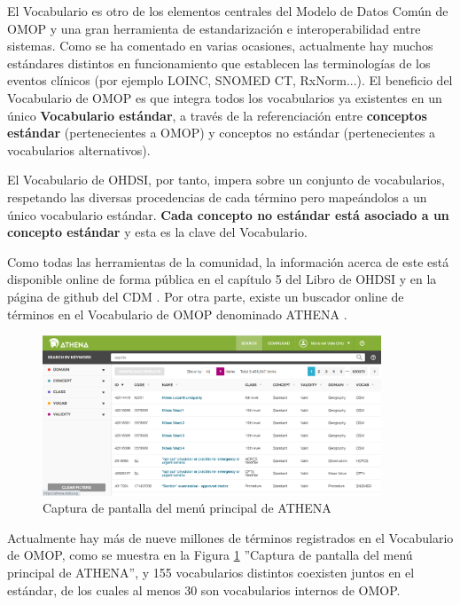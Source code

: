 El Vocabulario es otro de los elementos centrales del Modelo de Datos Común de OMOP y una gran herramienta de estandarización e interoperabilidad entre sistemas. Como se ha comentado en varias ocasiones, actualmente hay muchos estándares distintos en funcionamiento que establecen las terminologías de los eventos clínicos (por ejemplo LOINC, SNOMED CT, RxNorm...). El beneficio del Vocabulario de OMOP es que integra todos los vocabularios ya existentes en un único \textbf{Vocabulario estándar}, a través de la referenciación entre \textbf{conceptos estándar} (pertenecientes a OMOP) y conceptos no estándar (pertenecientes a vocabularios alternativos).

El Vocabulario de OHDSI, por tanto, impera sobre un conjunto de vocabularios, respetando las diversas procedencias de cada término pero mapeándolos a un único vocabulario estándar. \textbf{Cada concepto no estándar está asociado a un concepto estándar} y esta es la clave del Vocabulario. 

Como todas las herramientas de la comunidad, la información acerca de este está disponible online de forma pública en el capítulo 5 del Libro de OHDSI \cite{OHDSIbook} y en la página de github del CDM \cite{gitPagesCMD}. Por otra parte, existe un buscador online de términos en el Vocabulario de OMOP denominado ATHENA \cite{ATHENAweb}. 

\begin{figure}[H]
\centering
\includegraphics[width=0.90\textwidth]{figures/ATHENAcap.png}
     \caption{Captura de pantalla del menú principal de ATHENA}
    \label{fig:ATHENAcap}
\end{figure}

Actualmente hay más de nueve millones de términos registrados en el Vocabulario de OMOP, como se muestra en la Figura \ref{fig:ATHENAcap} ''Captura de pantalla del menú principal de ATHENA'', y 155 vocabularios distintos coexisten juntos en el estándar, de los cuales al menos 30 son vocabularios internos de OMOP.

